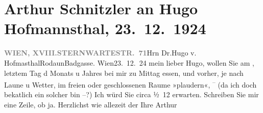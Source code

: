 

               \section[Arthur Schnitzler an Hugo Hofmannsthal, 23. 12. 1924]{ Arthur Schnitzler an Hugo Hofmannsthal, 23. 12. 1924}\nopagebreak{}\rehead{ }\begin{ledgroupsized}[t]{13cm}\normalsize\beginnumbering{} \toendnotes[C]{\smallbreak\pagebreak[2]} 
\toendnotes[C]{\smallbreak}\pstart{}{\pb}\label{T_L02424-1v}\label{T_L02424-1h}\pend{}\pstart{}\textcolor{gray}{\textbf{WIEN, XVIII.}}\pend{}\pstart{}\textcolor{gray}{\textbf{STERNWARTESTR. 71}}\pend{}{\bigskip}\pstart{}Hrn Dr.\pend{}\pstart{}Hugo v. Hofma{\geminationn}sthal\pend{}\pstart{}Rodaun\pend{}\pstart{}Badgasse.\pend{}{\bigskip}\pstart
           \raggedleft{}{\pb}Wien23. 12. 24\pend
           \pstart
           mein lieber Hugo, wollen Sie am \label{K_L02424_1v}\label{K_L02424_1h}, letztem Tag d Monats u Jahres bei mir zu Mittag essen, und vorher, je nach Laune u
               Wetter, im freien oder geschlossenen Raume »plaudern«, \substVorne{}\textsuperscript{– }\substDazwischen{}(\substHinten{}da ich doch beka{\geminationn}tlich ein solcher bin –?) Ich
               würd {\pb}Sie circa ½ 12 erwarten. Schreiben Sie
               mir eine Zeile, ob ja. Herzlichst wie allezeit der Ihre\pend
           \pstart \spacefill\mbox{Arthur}\pend{}          \endnumbering{}\end{ledgroupsized}  \newcommand{\dateiname}{L02424}\newcommand{\titel}{Arthur Schnitzler an Hugo Hofmannsthal, 23. 12. 1924}\newcommand{\editorInnen}{Martin Anton Müller und Gerd-Hermann Susen}
            \footnotesize
\begin{ledgroupsized}[t]{11.5cm}
\end{ledgroupsized}
         
      